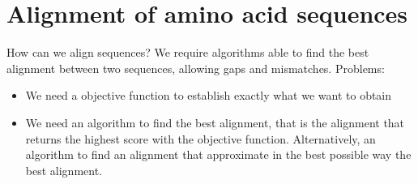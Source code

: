 \section{Alignment of amino acid sequences}
How can we align sequences?
We require algorithms able to find the best alignment between two sequences,
allowing gaps and mismatches.
Problems:
\begin{itemize}
  \item We need a objective function to establish exactly what we want to obtain
  \item We need an algorithm to find the best alignment, that is the alignment
that returns the highest score with the objective function. Alternatively, an
algorithm to find an alignment that approximate in the best possible way the
best alignment.
\end{itemize}


